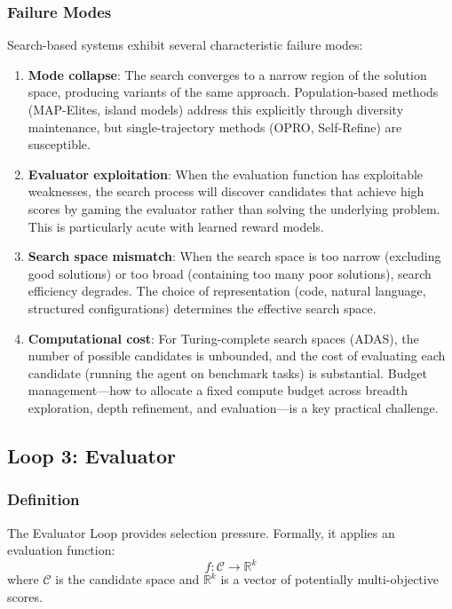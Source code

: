 \subsubsection{Failure Modes}

Search-based systems exhibit several characteristic failure modes:

\begin{enumerate}
    \item \textbf{Mode collapse}: The search converges to a narrow region of the solution space, producing variants of the same approach. Population-based methods (MAP-Elites, island models) address this explicitly through diversity maintenance, but single-trajectory methods (OPRO, Self-Refine) are susceptible.

    \item \textbf{Evaluator exploitation}: When the evaluation function has exploitable weaknesses, the search process will discover candidates that achieve high scores by gaming the evaluator rather than solving the underlying problem. This is particularly acute with learned reward models.

    \item \textbf{Search space mismatch}: When the search space is too narrow (excluding good solutions) or too broad (containing too many poor solutions), search efficiency degrades. The choice of representation (code, natural language, structured configurations) determines the effective search space.

    \item \textbf{Computational cost}: For Turing-complete search spaces (ADAS), the number of possible candidates is unbounded, and the cost of evaluating each candidate (running the agent on benchmark tasks) is substantial. Budget management---how to allocate a fixed compute budget across breadth exploration, depth refinement, and evaluation---is a key practical challenge.
\end{enumerate}


\subsection{Loop 3: Evaluator}
\label{sec:evaluator-loop}

\subsubsection{Definition}

The Evaluator Loop provides selection pressure. Formally, it applies an evaluation function:
\begin{equation}
    f: \mathcal{C} \rightarrow \mathbb{R}^k
\end{equation}
where $\mathcal{C}$ is the candidate space and $\mathbb{R}^k$ is a vector of potentially multi-objective scores.

